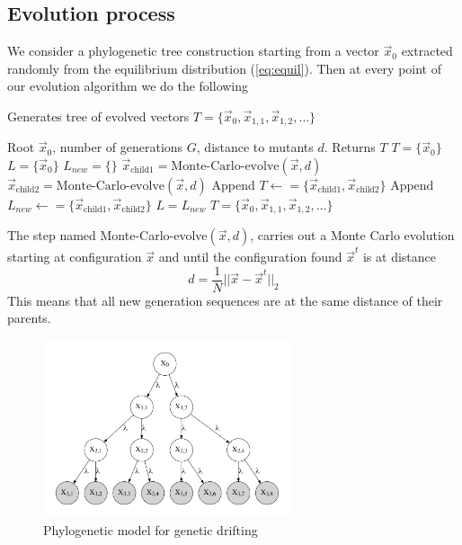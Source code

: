 \documentclass[10pt]{article}
\def\vx{\vec x}
\begin{document}
\subsection{Evolution process}

We consider a phylogenetic tree construction starting from a vector $\vx_0$ extracted randomly from the equilibrium distribution (\ref{eq:equil}). Then at every point of our evolution algorithm we do the following

\begin{algorithm} 
\caption{Generates tree of evolved vectors $T = \{\vx_0, \vx_{1,1}, \vx_{1,2}, \ldots\}$}
\begin{algorithmic}
\REQUIRE Root $\vx_0$, number of generations $G$, distance to mutants $d$.
\ENSURE Returns $T$
\STATE $T = \{ \vx_0 \}$  
\STATE $L = \{\vx_0 \} $  
  \STATE $L_{new} = \{\}$ 
  \FOR{($\vx$ in $L$)}
    \STATE $\vx_{\mbox{child1}} = \mbox{Monte-Carlo-evolve}(\vx, d)$
    \STATE $\vx_{\mbox{child2}} = \mbox{Monte-Carlo-evolve}(\vx, d)$
    \STATE Append $T \leftarrow= \{\vx_{\mbox{child1}}, \vx_{\mbox{child2}}\}$
    \STATE Append $L_{new} \leftarrow= \{\vx_{\mbox{child1}}, \vx_{\mbox{child2}}\}$
  \ENDFOR
  \STATE $L = L_{new}$
\ENDFOR
\RETURN $T = \{\vx_0, \vx_{1,1}, \vx_{1,2}, \ldots\}$
\end{algorithmic} \label{alg:1}
\end{algorithm}

The step named Monte-Carlo-evolve$(\vx,d)$, carries out a Monte Carlo evolution starting at configuration $\vx$  and until the configuration found  $\vx^t$ is at distance 
\[d = \frac 1 N ||\vx - \vx^t||_2 \]
This means that all new generation sequences are at the same distance of their parents.


\begin{figure}[!htb]
\begin{center}
\includegraphics[width=0.65\textwidth]{Images/tree.pdf}
\end{center}
\caption{ Phylogenetic model for genetic drifting \label{fig:tree}}
\end{figure}
\end{document}
